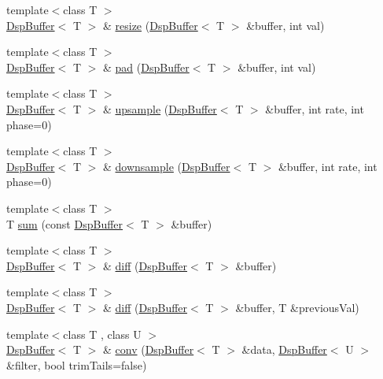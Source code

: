 \begin{DoxyCompactItemize}
\item 
{\footnotesize template$<$class T $>$ }\\\hyperlink{class_smart_dsp_1_1_dsp_buffer}{Dsp\+Buffer}$<$ T $>$ \& \hyperlink{namespace_smart_dsp_a124f7bbe35df282b7cce26acb8a47c0d}{resize} (\hyperlink{class_smart_dsp_1_1_dsp_buffer}{Dsp\+Buffer}$<$ T $>$ \&buffer, int val)
\item 
{\footnotesize template$<$class T $>$ }\\\hyperlink{class_smart_dsp_1_1_dsp_buffer}{Dsp\+Buffer}$<$ T $>$ \& \hyperlink{namespace_smart_dsp_a9d99ec3d0a0650597dbde7a308b2b086}{pad} (\hyperlink{class_smart_dsp_1_1_dsp_buffer}{Dsp\+Buffer}$<$ T $>$ \&buffer, int val)
\item 
{\footnotesize template$<$class T $>$ }\\\hyperlink{class_smart_dsp_1_1_dsp_buffer}{Dsp\+Buffer}$<$ T $>$ \& \hyperlink{namespace_smart_dsp_afd38ef5b39c356f89210c6565e0c29ac}{upsample} (\hyperlink{class_smart_dsp_1_1_dsp_buffer}{Dsp\+Buffer}$<$ T $>$ \&buffer, int rate, int phase=0)
\item 
{\footnotesize template$<$class T $>$ }\\\hyperlink{class_smart_dsp_1_1_dsp_buffer}{Dsp\+Buffer}$<$ T $>$ \& \hyperlink{namespace_smart_dsp_ab15045f3bb3a178cf661a7a1cf7dbcd5}{downsample} (\hyperlink{class_smart_dsp_1_1_dsp_buffer}{Dsp\+Buffer}$<$ T $>$ \&buffer, int rate, int phase=0)
\item 
{\footnotesize template$<$class T $>$ }\\T \hyperlink{namespace_smart_dsp_a50f0e15e122979cea19eda960ea4ba3a}{sum} (const \hyperlink{class_smart_dsp_1_1_dsp_buffer}{Dsp\+Buffer}$<$ T $>$ \&buffer)
\item 
{\footnotesize template$<$class T $>$ }\\\hyperlink{class_smart_dsp_1_1_dsp_buffer}{Dsp\+Buffer}$<$ T $>$ \& \hyperlink{namespace_smart_dsp_a989f5ca171737d8ba47652cbf823265d}{diff} (\hyperlink{class_smart_dsp_1_1_dsp_buffer}{Dsp\+Buffer}$<$ T $>$ \&buffer)
\item 
{\footnotesize template$<$class T $>$ }\\\hyperlink{class_smart_dsp_1_1_dsp_buffer}{Dsp\+Buffer}$<$ T $>$ \& \hyperlink{namespace_smart_dsp_a52d7392a2267c1cb526b77c714dc34f9}{diff} (\hyperlink{class_smart_dsp_1_1_dsp_buffer}{Dsp\+Buffer}$<$ T $>$ \&buffer, T \&previous\+Val)
\item 
{\footnotesize template$<$class T , class U $>$ }\\\hyperlink{class_smart_dsp_1_1_dsp_buffer}{Dsp\+Buffer}$<$ T $>$ \& \hyperlink{namespace_smart_dsp_ad74d7b5bcad55ce7ed61774be7ba7709}{conv} (\hyperlink{class_smart_dsp_1_1_dsp_buffer}{Dsp\+Buffer}$<$ T $>$ \&data, \hyperlink{class_smart_dsp_1_1_dsp_buffer}{Dsp\+Buffer}$<$ U $>$ \&filter, bool trim\+Tails=false)

\end{DoxyCompactItemize}
